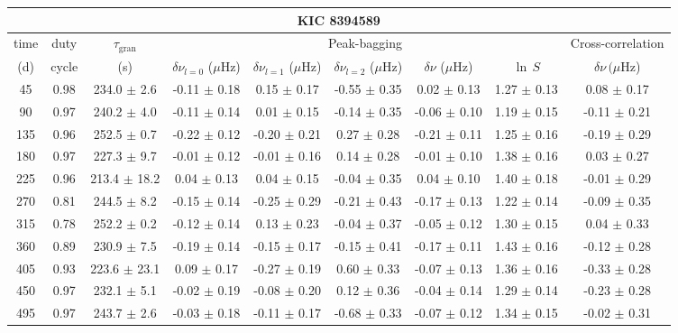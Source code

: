 \documentclass[twocolumn]{aastex61}%
\begin{document}
\begin{table*}[ht]\centering\fontsize{9.}{7.}\selectfont
\begin{tabular}{ccc|ccccc|c}
\multicolumn{9}{c}{KIC 8394589}\\ \hline\hline
time & duty & $\tau_\text{gran}$ &\multicolumn{5}{c|}{Peak-bagging}&Cross-correlation\\
(d)& cycle & (s)&$\delta\nu_{l=0}$ ($\mu$Hz) & $\delta\nu_{l=1}$ ($\mu$Hz) & $\delta\nu_{l=2}$ ($\mu$Hz) & $\delta\nu$ ($\mu$Hz)& $\ln\,S$ & $\delta\nu\,(\mu$Hz)\\\hline
45 & 0.98 & 234.0 $\pm$ 2.6 & -0.11 $\pm$ 0.18 & 0.15 $\pm$ 0.17 & -0.55 $\pm$ 0.35 & 0.02 $\pm$ 0.13 & 1.27 $\pm$ 0.13 & 0.08 $\pm$ 0.17\\
90 & 0.97 & 240.2 $\pm$ 4.0 & -0.11 $\pm$ 0.14 & 0.01 $\pm$ 0.15 & -0.14 $\pm$ 0.35 & -0.06 $\pm$ 0.10 & 1.19 $\pm$ 0.15 & -0.11 $\pm$ 0.21\\
135 & 0.96 & 252.5 $\pm$ 0.7 & -0.22 $\pm$ 0.12 & -0.20 $\pm$ 0.21 & 0.27 $\pm$ 0.28 & -0.21 $\pm$ 0.11 & 1.25 $\pm$ 0.16 & -0.19 $\pm$ 0.29\\
180 & 0.97 & 227.3 $\pm$ 9.7 & -0.01 $\pm$ 0.12 & -0.01 $\pm$ 0.16 & 0.14 $\pm$ 0.28 & -0.01 $\pm$ 0.10 & 1.38 $\pm$ 0.16 & 0.03 $\pm$ 0.27\\
225 & 0.96 & 213.4 $\pm$ 18.2 & 0.04 $\pm$ 0.13 & 0.04 $\pm$ 0.15 & -0.04 $\pm$ 0.35 & 0.04 $\pm$ 0.10 & 1.40 $\pm$ 0.18 & -0.01 $\pm$ 0.29\\
270 & 0.81 & 244.5 $\pm$ 8.2 & -0.15 $\pm$ 0.14 & -0.25 $\pm$ 0.29 & -0.21 $\pm$ 0.43 & -0.17 $\pm$ 0.13 & 1.22 $\pm$ 0.14 & -0.09 $\pm$ 0.35\\
315 & 0.78 & 252.2 $\pm$ 0.2 & -0.12 $\pm$ 0.14 & 0.13 $\pm$ 0.23 & -0.04 $\pm$ 0.37 & -0.05 $\pm$ 0.12 & 1.30 $\pm$ 0.15 & 0.04 $\pm$ 0.33\\
360 & 0.89 & 230.9 $\pm$ 7.5 & -0.19 $\pm$ 0.14 & -0.15 $\pm$ 0.17 & -0.15 $\pm$ 0.41 & -0.17 $\pm$ 0.11 & 1.43 $\pm$ 0.16 & -0.12 $\pm$ 0.28\\
405 & 0.93 & 223.6 $\pm$ 23.1 & 0.09 $\pm$ 0.17 & -0.27 $\pm$ 0.19 & 0.60 $\pm$ 0.33 & -0.07 $\pm$ 0.13 & 1.36 $\pm$ 0.16 & -0.33 $\pm$ 0.28\\
450 & 0.97 & 232.1 $\pm$ 5.1 & -0.02 $\pm$ 0.19 & -0.08 $\pm$ 0.20 & 0.12 $\pm$ 0.36 & -0.04 $\pm$ 0.14 & 1.29 $\pm$ 0.14 & -0.23 $\pm$ 0.28\\
495 & 0.97 & 243.7 $\pm$ 2.6 & -0.03 $\pm$ 0.18 & -0.11 $\pm$ 0.17 & -0.68 $\pm$ 0.33 & -0.07 $\pm$ 0.12 & 1.34 $\pm$ 0.15 & -0.02 $\pm$ 0.31\\

\end{tabular}
\end{table*}
\end{document}
